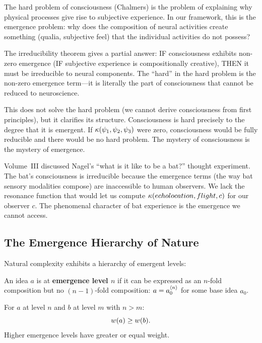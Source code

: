 \begin{interpretation}
The hard problem of consciousness (Chalmers) is the problem of explaining why
physical processes give rise to subjective experience. In our framework, this
is the emergence problem: why does the composition of neural activities create
something (qualia, subjective feel) that the individual activities do not possess?

The irreducibility theorem gives a partial answer: IF consciousness exhibits
non-zero emergence (IF subjective experience is compositionally creative), THEN
it must be irreducible to neural components. The ``hard'' in the hard problem
is the non-zero emergence term---it is literally the part of consciousness that
cannot be reduced to neuroscience.

This does not solve the hard problem (we cannot derive consciousness from first
principles), but it clarifies its structure. Consciousness is hard precisely to
the degree that it is emergent. If $\kappa(\psi_1, \psi_2, \psi_3)$ were zero,
consciousness would be fully reducible and there would be no hard problem. The
mystery of consciousness is the mystery of emergence.

Volume~III discussed Nagel's ``what is it like to be a bat?'' thought experiment.
The bat's consciousness is irreducible because the emergence terms (the way bat
sensory modalities compose) are inaccessible to human observers. We lack the
resonance function that would let us compute $\kappa(echolocation, flight, c)$
for our observer $c$. The phenomenal character of bat experience is the emergence
we cannot access.
\end{interpretation}

\subsection{The Emergence Hierarchy of Nature}

Natural complexity exhibits a hierarchy of emergent levels:

\begin{definition}
\label{def:emergence-level}
An idea $a$ is at \textbf{emergence level $n$} if it can be expressed as an
$n$-fold composition but no $(n-1)$-fold composition: $a = a_0^{\langle n \rangle}$ for
some base idea $a_0$.
\end{definition}

\begin{theorem}
\label{thm:emergence-level-hierarchy}
For $a$ at level $n$ and $b$ at level $m$ with $n > m$:
\[
  w(a) \geq w(b).
\]
Higher emergence levels have greater or equal weight.
\end{theorem}

